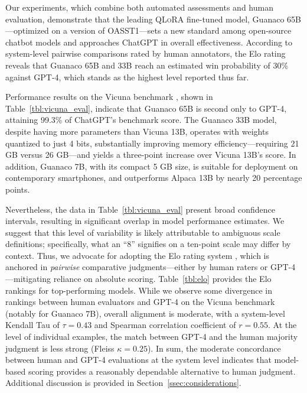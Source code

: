 Our experiments, which combine both automated assessments and human evaluation, demonstrate that the leading \textsc{QLoRA} fine-tuned model, {Guanaco} 65B—optimized on a version of OASST1—sets a new standard among open-source chatbot models and approaches ChatGPT in overall effectiveness. According to system-level pairwise comparisons rated by human annotators, the Elo rating reveals that {Guanaco} 65B and 33B reach an estimated win probability of 30\% against GPT-4, which stands as the highest level reported thus far.

Performance results on the Vicuna benchmark \cite{vicuna2023}, shown in Table~\ref{tbl:vicuna_eval}, indicate that {Guanaco} 65B is second only to GPT-4, attaining 99.3\% of ChatGPT’s benchmark score. The {Guanaco} 33B model, despite having more parameters than Vicuna 13B, operates with weights quantized to just 4 bits, substantially improving memory efficiency—requiring 21 GB versus 26 GB—and yields a three-point increase over Vicuna 13B’s score. In addition, {Guanaco} 7B, with its compact 5 GB size, is suitable for deployment on contemporary smartphones, and outperforms Alpaca 13B by nearly 20 percentage points.

Nevertheless, the data in Table~\ref{tbl:vicuna_eval} present broad confidence intervals, resulting in significant overlap in model performance estimates. We suggest that this level of variability is likely attributable to ambiguous scale definitions; specifically, what an “8” signifies on a ten-point scale may differ by context. Thus, we advocate for adopting the Elo rating system \citep{elo1967proposed}, which is anchored in \textit{pairwise} comparative judgments—either by human raters or GPT-4—mitigating reliance on absolute scoring. Table~\ref{tbl:elo} provides the Elo rankings for top-performing models. While we observe some divergence in rankings between human evaluators and GPT-4 on the Vicuna benchmark (notably for Guanaco 7B), overall alignment is moderate, with a system-level Kendall Tau of $\tau=0.43$ and Spearman correlation coefficient of $r=0.55$. At the level of individual examples, the match between GPT-4 and the human majority judgment is less strong (Fleiss $\kappa=0.25$). In sum, the moderate concordance between human and GPT-4 evaluations at the system level indicates that model-based scoring provides a reasonably dependable alternative to human judgment. Additional discussion is provided in Section~\ref{ssec:considerations}.

